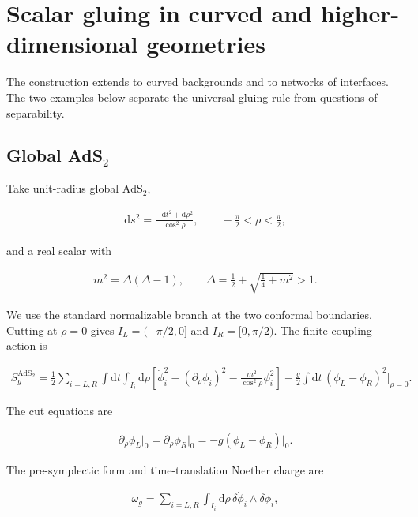 \section{Scalar gluing in curved and higher-dimensional geometries}\label{sec:scalar-geometries}

The construction extends to curved backgrounds and to networks of interfaces. The two examples below separate the universal gluing rule from questions of separability.

\subsection{\texorpdfstring{Global AdS$_2$}{Global AdS2}}\label{subsec:global-ads2}

Take unit-radius global $\mathrm{AdS}_2$,

\begin{align}
\mathrm ds^2=\frac{-\mathrm dt^2+\mathrm d\rho^2}{\cos^2\rho},
\qquad
-\frac\pi2<\rho<\frac\pi2,
\end{align}

and a real scalar with

\begin{align}
m^2=\Delta(\Delta-1),
\qquad
\Delta=\frac12+\sqrt{\frac14+m^2}>1.
\end{align}

We use the standard normalizable branch at the two conformal boundaries. Cutting at $\rho=0$ gives $I_L=(-\pi/2,0]$ and $I_R=[0,\pi/2)$. The finite-coupling action is

\begin{align}
S_g^{\mathrm{AdS}_2}
=\frac12\sum_{i=L,R}\int\mathrm dt\int_{I_i}\mathrm d\rho
\left[
\dot\phi_i^2-(\partial_\rho\phi_i)^2
-\frac{m^2}{\cos^2\rho}\phi_i^2
\right]
-\frac g2\int\mathrm dt\,(\phi_L-\phi_R)^2\big|_{\rho=0}.
\end{align}

The cut equations are

\begin{align}
\partial_\rho\phi_L\big|_0
=\partial_\rho\phi_R\big|_0
=-g(\phi_L-\phi_R)\big|_0.
\end{align}

The pre-symplectic form and time-translation Noether charge are

\begin{align}
\omega_g
=\sum_{i=L,R}\int_{I_i}\mathrm d\rho\,
\delta\dot\phi_i\wedge\delta\phi_i,
\end{align}


